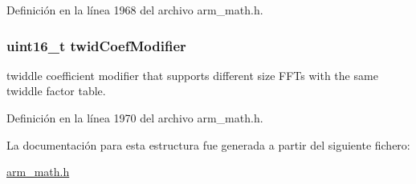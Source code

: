 Definición en la línea 1968 del archivo arm\+\_\+math.\+h.

\subsubsection[{\texorpdfstring{twid\+Coef\+Modifier}{twidCoefModifier}}]{\setlength{\rightskip}{0pt plus 5cm}uint16\+\_\+t twid\+Coef\+Modifier}\hypertarget{structarm__cfft__radix2__instance__q15_afe772e5b5001c9d8e85032115a8df5bf}{}\label{structarm__cfft__radix2__instance__q15_afe772e5b5001c9d8e85032115a8df5bf}
twiddle coefficient modifier that supports different size F\+F\+Ts with the same twiddle factor table. 

Definición en la línea 1970 del archivo arm\+\_\+math.\+h.



La documentación para esta estructura fue generada a partir del siguiente fichero\+:\begin{DoxyCompactItemize}
\item 
\hyperlink{arm__math_8h}{arm\+\_\+math.\+h}\end{DoxyCompactItemize}
